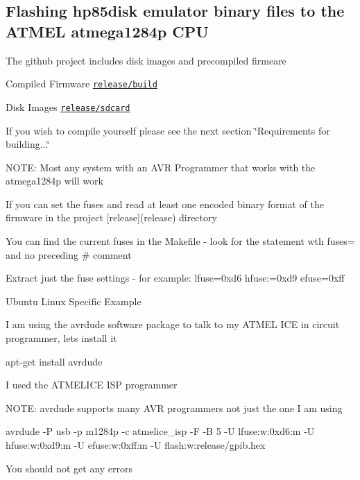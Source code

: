 \subsection*{Flashing hp85disk emulator binary files to the A\+T\+M\+EL atmega1284p C\+PU}


\begin{DoxyItemize}
\item The github project includes disk images and precompiled firmeare
\begin{DoxyItemize}
\item Compiled Firmware \href{release/build}{\tt release/build}
\item Disk Images \href{release/sdcard}{\tt release/sdcard}
\item If you wish to compile yourself please see the next section \char`\"{}\+Requirements for building...\char`\"{}
\end{DoxyItemize}
\item N\+O\+TE\+: Most any system with an A\+VR Programmer that works with the atmega1284p will work
\begin{DoxyItemize}
\item If you can set the fuses and read at least one encoded binary format of the firmware in the project \mbox{[}release\mbox{]}(release) directory
\begin{DoxyItemize}
\item You can find the current fuses in the Makefile -\/ look for the statement wth fuses= and no preceding \textquotesingle{}\#\textquotesingle{} comment
\item Extract just the fuse settings -\/ for example\+: lfuse=0xd6 hfuse\+:=0xd9 efuse=0xff
\end{DoxyItemize}
\end{DoxyItemize}
\item Ubuntu Linux Specific Example
\begin{DoxyItemize}
\item I am using the avrdude software package to talk to my A\+T\+M\+EL I\+CE in circuit programmer, lets install it
\begin{DoxyItemize}
\item apt-\/get install avrdude
\end{DoxyItemize}
\item I used the A\+T\+M\+E\+L\+I\+CE I\+SP programmer
\begin{DoxyItemize}
\item N\+O\+TE\+: avrdude supports many A\+VR programmers not just the one I am using
\item avrdude -\/P usb -\/p m1284p -\/c atmelice\+\_\+isp -\/F -\/B 5 -\/U lfuse\+:w\+:0xd6\+:m -\/U hfuse\+:w\+:0xd9\+:m -\/U efuse\+:w\+:0xff\+:m -\/U flash\+:w\+:release/gpib.\+hex
\begin{DoxyItemize}
\item You should not get any errors 


\end{DoxyItemize}
\end{DoxyItemize}
\end{DoxyItemize}
\end{DoxyItemize}

